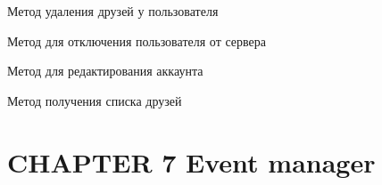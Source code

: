 \documentclass[letterpaper,10pt,english]{sphinxmanual}
\begin{document}
\begin{fulllineitems}
\begin{fulllineitems}
\end{fulllineitems}


\begin{fulllineitems}
\label{userManager:mainServer.userManager.UserManager.deleteFriends}
Метод удаления друзей у пользователя

\end{fulllineitems}


\begin{fulllineitems}
\label{userManager:mainServer.userManager.UserManager.disconnectUser}
Метод для отключения пользователя от сервера

\end{fulllineitems}


\begin{fulllineitems}
\label{userManager:mainServer.userManager.UserManager.editAccount}
Метод для редактирования аккаунта

\end{fulllineitems}


\begin{fulllineitems}
\label{userManager:mainServer.userManager.UserManager.getListFriends}
Метод получения списка друзей

\end{fulllineitems}


\end{fulllineitems}



\chapter{CHAPTER 7 Event manager}
\label{eventManager::doc}\label{eventManager:chapter-7-event-manager}
\end{document}
